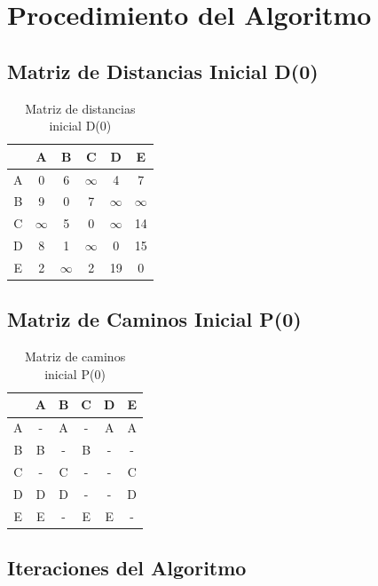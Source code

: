 \documentclass[12pt]{article}
\begin{document}
\clearpage
\section{Procedimiento del Algoritmo}
\subsection{Matriz de Distancias Inicial D(0)}
\begin{table}[h!]
\centering
\begin{tabular}{|c|c|c|c|c|c|}
\hline
 & A & B & C & D & E \\\hline
A & 0 & 6 & $\infty$ & 4 & 7 \\\hline
B & 9 & 0 & 7 & $\infty$ & $\infty$ \\\hline
C & $\infty$ & 5 & 0 & $\infty$ & 14 \\\hline
D & 8 & 1 & $\infty$ & 0 & 15 \\\hline
E & 2 & $\infty$ & 2 & 19 & 0 \\\hline
\end{tabular}
\caption{Matriz de distancias inicial D(0)}
\end{table}

\clearpage
\subsection{Matriz de Caminos Inicial P(0)}
\begin{table}[h!]
\centering
\begin{tabular}{|c|c|c|c|c|c|}
\hline
 & A & B & C & D & E \\\hline
A & - & A & - & A & A \\\hline
B & B & - & B & - & - \\\hline
C & - & C & - & - & C \\\hline
D & D & D & - & - & D \\\hline
E & E & - & E & E & - \\\hline
\end{tabular}
\caption{Matriz de caminos inicial P(0)}
\end{table}

\subsection{Iteraciones del Algoritmo}
\end{document}
